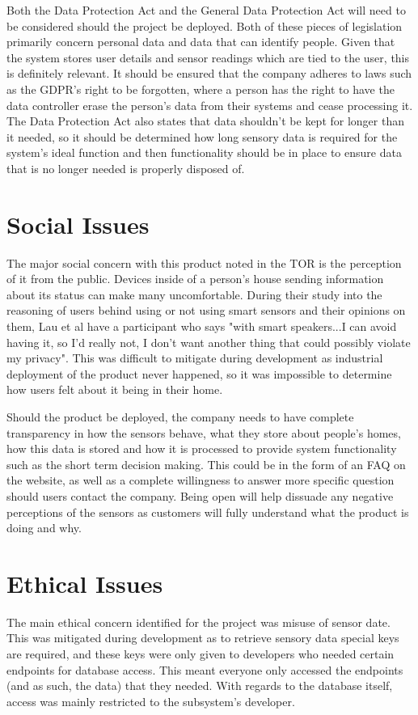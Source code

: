 \documentclass[]{report}
\begin{document}
Both the Data Protection Act\cite{dataprotectionact2018} and the General Data Protection Act\cite{gdpr} will need to be considered should the project be deployed. Both of these pieces of legislation primarily concern personal data and data that can identify people. Given that the system stores user details and sensor readings which are tied to the user, this is definitely relevant. It should be ensured that the company adheres to laws such as the GDPR's right to be forgotten, where a person has the right to have the data controller erase the person's data from their systems and cease processing it. The Data Protection Act also states that data shouldn't be kept for longer than it needed, so it should be determined how long sensory data is required for the system's ideal function and then functionality should be in place to ensure data that is no longer needed is properly disposed of.

\section{Social Issues}
The major social concern with this product noted in the TOR is the perception of it from the public. Devices inside of a person's house sending information about its status can make many uncomfortable. During their study into the reasoning of users behind using or not using smart sensors and their opinions on them, Lau et al\cite{lau2018alexa} have a participant who says "with smart speakers...I can avoid having it, so I’d really not, I don’t want another thing that could possibly violate my privacy". This was difficult to mitigate during development as industrial deployment of the product never happened, so it was impossible to determine how users felt about it being in their home.
\medskip

Should the product be deployed, the company needs to have complete transparency in how the sensors behave, what they store about people's homes, how this data is stored and how it is processed to provide system functionality such as the short term decision making. This could be in the form of an FAQ on the website, as well as a complete willingness to answer more specific question should users contact the company. Being open will help dissuade any negative perceptions of the sensors as customers will fully understand what the product is doing and why.

\section{Ethical Issues}
The main ethical concern identified for the project was misuse of sensor date. This was mitigated during development as to retrieve sensory data special keys are required, and these keys were only given to developers who needed certain endpoints for database access. This meant everyone only accessed the endpoints (and as such, the data) that they needed. With regards to the database itself, access was mainly restricted to the subsystem's developer.
\medskip
\end{document}
